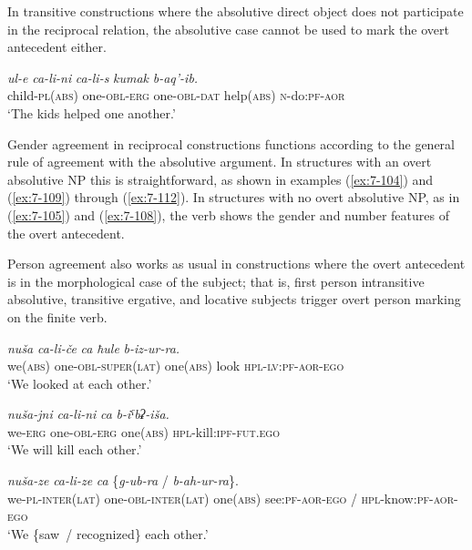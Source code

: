 ﻿\documentclass[output=paper]{langsci/langscibook}
\begin{document}
In transitive constructions where the absolutive direct object does not
participate in the reciprocal relation, the absolutive case cannot be
used to mark the overt antecedent either.

\ea %
\gll *\emph{ul-e} \emph{ca-li-ni} \emph{ca-li-s} \emph{kumak} \emph{b-aq'-ib.}\\
child-\textsc{pl}(\textsc{abs}) one-\textsc{obl}-\textsc{erg} one-\textsc{obl}-\textsc{dat} help(\textsc{abs}) \textsc{n}-do:\textsc{pf}-\textsc{aor}\\
\glt `The kids helped one another.'
\z

Gender agreement in reciprocal constructions functions according to the
general rule of agreement with the absolutive argument. In structures
with an overt absolutive NP this is straightforward, as shown in
examples (\ref{ex:7-104}) and (\ref{ex:7-109}) through (\ref{ex:7-112}). In structures with no overt
absolutive NP, as in (\ref{ex:7-105}) and (\ref{ex:7-108}), the verb shows the gender and
number features of the overt antecedent.

Person agreement also works as usual in constructions where the overt
antecedent is in the morphological case of the subject; that is, first
person intransitive absolutive, transitive ergative, and locative
subjects trigger overt person marking on the finite verb.

\ea %
\gll \emph{nuša} \emph{ca-li-če} \emph{ca} \emph{ħule} \emph{b-iz-ur-ra.}\\
we(\textsc{abs}) one-\textsc{obl}-\textsc{super(lat)} one(\textsc{abs}) look \textsc{hpl}-\textsc{lv}:\textsc{pf}-\textsc{aor}-\textsc{ego}\\
\glt `We looked at each other.'

\ex %
\gll \emph{nuša-jni} \emph{ca-li-ni} \emph{ca} \emph{b-iˤbʡ-iša.}\\
we-\textsc{erg} one-\textsc{obl}-\textsc{erg} one(\textsc{abs}) \textsc{hpl}-kill:\textsc{ipf}-\textsc{fut}.\textsc{ego}\\
\glt `We will kill each other.'

\ex %
\gll \emph{nuša-ze} \emph{ca-li-ze} \emph{ca} \{\emph{g-ub-ra} / \emph{b-ah-ur-ra}\}.\\
we-\textsc{pl}-\textsc{inter(lat)} one-\textsc{obl}-\textsc{inter(lat)} one(\textsc{abs}) see:\textsc{pf}-\textsc{aor}-\textsc{ego} / \textsc{hpl}-know:\textsc{pf}-\textsc{aor}-\textsc{ego}\\
\glt `We \{saw~/ recognized\} each other.'
\z
\end{document}
